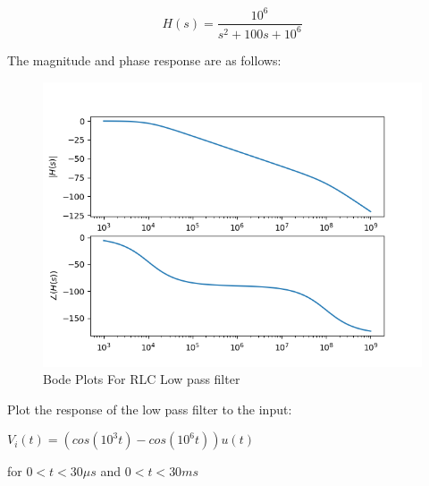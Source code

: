 \documentclass{article}
\begin{document}
\begin{equation}
    H(s) = \frac{10^6}{s^2 + 100s + 10^6}
\end{equation}

The magnitude and phase response are as follows:


\begin{figure}[h!]
\includegraphics[scale=0.8]{fig4.png}
\centering
\caption{Bode Plots For RLC Low pass filter}
\label{fig:Coupled Oscillations}
\end{figure}

Plot the response of the low pass filter to the input:\newline
\begin{center}
$V_i(t) = (cos(10^3t) - cos(10^6t))u(t)$
\end{center}
for $0<t<30\mu s$ and $0<t<30ms$
\end{document}
